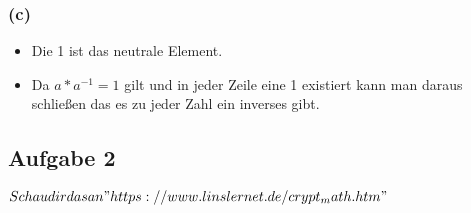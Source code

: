 \documentclass{article}
\begin{document}
\subsubsection*{(c)}
\begin{itemize}
    \item Die 1 ist das neutrale Element.
    \item Da \(a * a^{-1} = 1\) gilt und in jeder Zeile eine 1 existiert kann man daraus schließen das es zu jeder Zahl ein inverses gibt.
\end{itemize}

\subsection*{Aufgabe 2}

\(Schau dir das an "https://www.linslernet.de/crypt_math.htm"
\)
\end{document}
